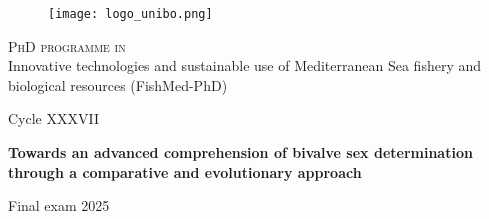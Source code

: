 \documentclass[main.tex]{subfiles}
\begin{document}
\begin{titlepage}
%
%
%
%
\begin{center}

\begin{figure}[h]
    \centering
    \texttt{[image: logo\_unibo.png]}
    \label{fig:logo}
\end{figure}

{{\Large{\textsc{PhD programme in}} \\
Innovative technologies and sustainable use of Mediterranean Sea fishery and biological resources (FishMed-PhD)}} 
\vspace{5mm}

{\large{Cycle XXXVII}}
\vspace{5mm}
\end{center}

{}

\vspace{15mm}

\begin{center} {

{\LARGE{\bf Towards an advanced comprehension of bivalve sex determination through a comparative and evolutionary approach}}\\

}\end{center}

\vspace{15mm} \par \noindent


\vspace{5mm} \par \noindent


\vspace{15mm}

\vfill

\begin{center}
Final exam 2025
\end{center}

\end{titlepage}
\end{document}
